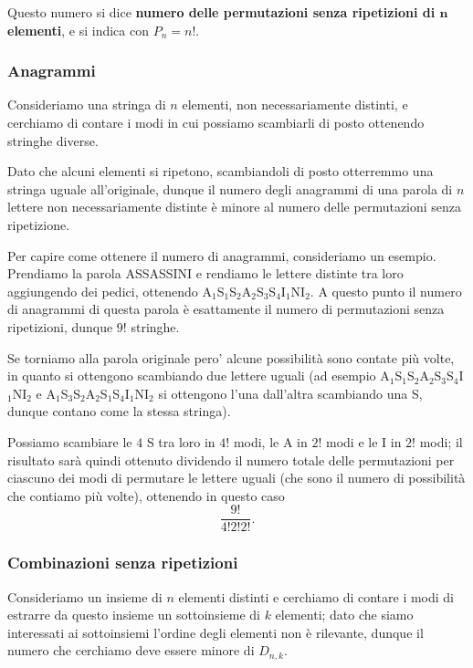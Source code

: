 Questo numero si dice \textbf{numero delle permutazioni senza ripetizioni di $\bm{n}$ elementi}, e si indica con $P_{n} = n!$.

\subsubsection{Anagrammi}

Consideriamo una stringa di $n$ elementi, non necessariamente distinti, e cerchiamo di contare i modi in cui possiamo scambiarli di posto ottenendo stringhe diverse.

Dato che alcuni elementi si ripetono, scambiandoli di posto otterremmo una stringa uguale all'originale, dunque il numero degli anagrammi di una parola di $n$ lettere non necessariamente distinte è minore al numero delle permutazioni senza ripetizione.

Per capire come ottenere il numero di anagrammi, consideriamo un esempio. Prendiamo la parola ASSASSINI e rendiamo le lettere distinte tra loro aggiungendo dei pedici, ottenendo A$_1$S$_1$S$_2$A$_2$S$_3$S$_4$I$_1$NI$_2$. A questo punto il numero di anagrammi di questa parola è esattamente il numero di permutazioni senza ripetizioni, dunque $9!$ stringhe. 

Se torniamo alla parola originale pero' alcune possibilità sono contate più volte, in quanto si ottengono scambiando due lettere uguali (ad esempio A$_1$S$_1$S$_2$A$_2$S$_3$S$_4$I$_1$NI$_2$ e A$_1$S$_3$S$_2$A$_2$S$_1$S$_4$I$_1$NI$_2$ si ottengono l'una dall'altra scambiando una S, dunque contano come la stessa stringa). 

Possiamo scambiare le $4$ S tra loro in $4!$ modi, le A in $2!$ modi e le I in $2!$ modi; il risultato sarà quindi ottenuto dividendo il numero totale delle permutazioni per ciascuno dei modi di permutare le lettere uguali (che sono il numero di possibilità che contiamo più volte), ottenendo in questo caso \[ 
    \frac{9!}{4!2!2!}
.\]

\subsubsection{Combinazioni senza ripetizioni}

Consideriamo un insieme di $n$ elementi distinti e cerchiamo di contare i modi di estrarre da questo insieme un sottoinsieme di $k$ elementi; dato che siamo interessati ai sottoinsiemi l'ordine degli elementi non è rilevante, dunque il numero che cerchiamo deve essere minore di $D_{n, k}$.


